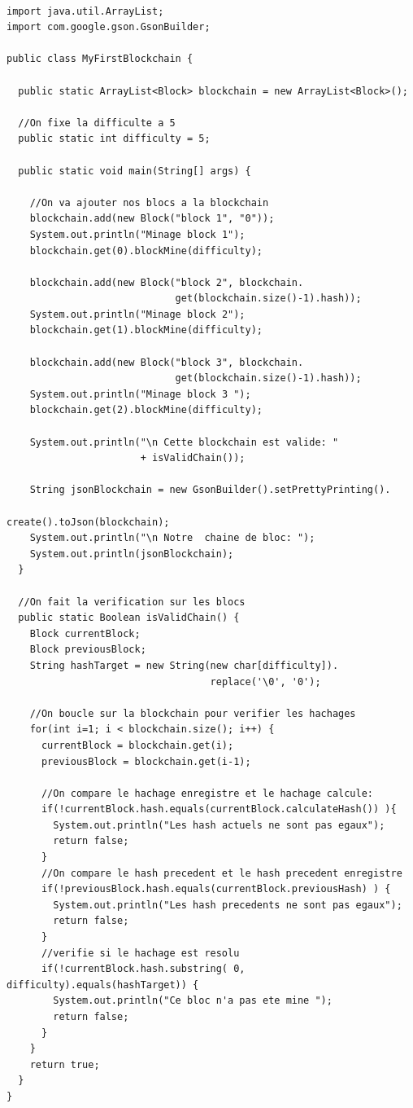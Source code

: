 \documentclass[12pt]{report}
\begin{document}
\begin{lstlisting}

import java.util.ArrayList;
import com.google.gson.GsonBuilder;

public class MyFirstBlockchain {
	
  public static ArrayList<Block> blockchain = new ArrayList<Block>();
  
  //On fixe la difficulte a 5
  public static int difficulty = 5;

  public static void main(String[] args) {	
    
    //On va ajouter nos blocs a la blockchain	
    blockchain.add(new Block("block 1", "0"));
    System.out.println("Minage block 1");
    blockchain.get(0).blockMine(difficulty);
		
    blockchain.add(new Block("block 2", blockchain.
                             get(blockchain.size()-1).hash));
    System.out.println("Minage block 2");
    blockchain.get(1).blockMine(difficulty);
		
    blockchain.add(new Block("block 3", blockchain.
                             get(blockchain.size()-1).hash));
    System.out.println("Minage block 3 ");
    blockchain.get(2).blockMine(difficulty);	
		
    System.out.println("\n Cette blockchain est valide: " 
                       + isValidChain());
		
    String jsonBlockchain = new GsonBuilder().setPrettyPrinting().
                                            create().toJson(blockchain);
    System.out.println("\n Notre  chaine de bloc: ");
    System.out.println(jsonBlockchain);
  }

  //On fait la verification	sur les blocs
  public static Boolean isValidChain() {
    Block currentBlock; 
    Block previousBlock;
    String hashTarget = new String(new char[difficulty]).
                                   replace('\0', '0');
		
    //On boucle sur la blockchain pour verifier les hachages
    for(int i=1; i < blockchain.size(); i++) {
      currentBlock = blockchain.get(i);
      previousBlock = blockchain.get(i-1);
      
      //On compare le hachage enregistre et le hachage calcule:
      if(!currentBlock.hash.equals(currentBlock.calculateHash()) ){
        System.out.println("Les hash actuels ne sont pas egaux");			
        return false;
      }
      //On compare le hash precedent et le hash precedent enregistre
      if(!previousBlock.hash.equals(currentBlock.previousHash) ) {
        System.out.println("Les hash precedents ne sont pas egaux");
        return false;
      }
      //verifie si le hachage est resolu
      if(!currentBlock.hash.substring( 0, difficulty).equals(hashTarget)) {
        System.out.println("Ce bloc n'a pas ete mine ");
        return false;
      }
    }
    return true;
  }
}

\end{lstlisting}
\end{document}
